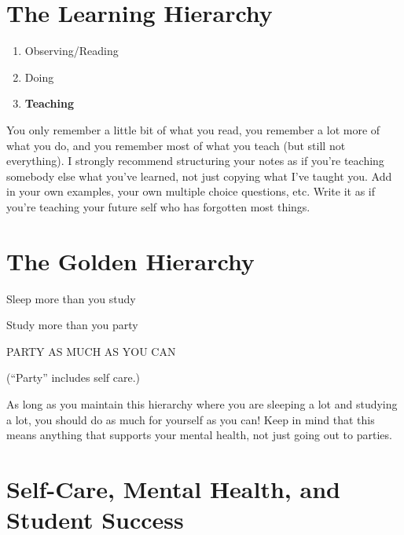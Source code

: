 \documentclass[
  letterpaper,
  DIV=11,
  numbers=noendperiod]{scrreprt}
\providecommand{\tightlist}{%
  \setlength{\itemsep}{0pt}\setlength{\parskip}{0pt}}\usepackage{longtable,booktabs,array}
\begin{document}
\hypertarget{the-learning-hierarchy}{%
\section{The Learning Hierarchy}\label{the-learning-hierarchy}}

\begin{enumerate}
\def\labelenumi{\arabic{enumi}.}
\tightlist
\item
  Observing/Reading
\item
  Doing
\item
  \textbf{Teaching}
\end{enumerate}

You only remember a little bit of what you read, you remember a lot more
of what you do, and you remember most of what you teach (but still not
everything). I strongly recommend structuring your notes as if you're
teaching somebody else what you've learned, not just copying what I've
taught you. Add in your own examples, your own multiple choice
questions, etc. Write it as if you're teaching your future self who has
forgotten most things.

\hypertarget{the-golden-hierarchy}{%
\section{The Golden Hierarchy}\label{the-golden-hierarchy}}

\centering

Sleep more than you study

\pspace\pause

Study more than you party

\pspace\pause

\Huge PARTY AS MUCH AS YOU CAN\pause

\footnotesize (``Party'' includes self care.)

\raggedright

As long as you maintain this hierarchy where you are sleeping a lot and
studying a lot, you should do as much for yourself as you can! Keep in
mind that this means anything that supports your mental health, not just
going out to parties.

\hypertarget{self-care-mental-health-and-student-success}{%
\section{Self-Care, Mental Health, and Student
Success}\label{self-care-mental-health-and-student-success}}
\end{document}
